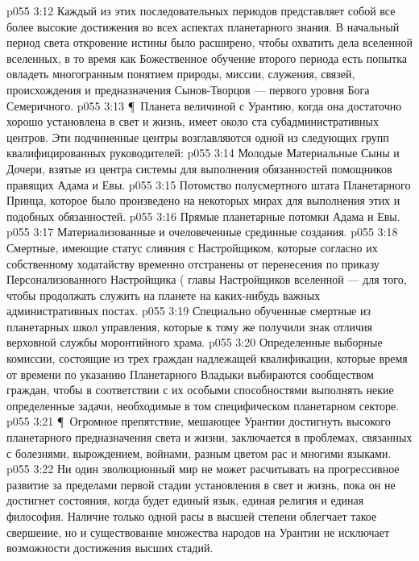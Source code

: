 \vs p055 3:12 Каждый из этих последовательных периодов представляет собой все более высокие достижения во всех аспектах планетарного знания. В начальный период света откровение истины было расширено, чтобы охватить дела вселенной вселенных, в то время как Божественное обучение второго периода есть попытка овладеть многогранным понятием природы, миссии, служения, связей, происхождения и предназначения Сынов\hyp{}Творцов --- первого уровня Бога Семеричного.
\vs p055 3:13 \P\ Планета величиной с Урантию, когда она достаточно хорошо установлена в свет и жизнь, имеет около ста субадминистративных центров. Эти подчиненные центры возглавляются одной из следующих групп квалифицированных руководителей:
\vs p055 3:14 \bibnobreakspace Молодые Материальные Сыны и Дочери, взятые из центра системы для выполнения обязанностей помощников правящих Адама и Евы.
\vs p055 3:15 \bibnobreakspace Потомство полусмертного штата Планетарного Принца, которое было произведено на некоторых мирах для выполнения этих и подобных обязанностей.
\vs p055 3:16 \bibnobreakspace Прямые планетарные потомки Адама и Евы.
\vs p055 3:17 \bibnobreakspace Материализованные и очеловеченные срединные создания.
\vs p055 3:18 \bibnobreakspace Смертные, имеющие статус слияния с Настройщиком, которые согласно их собственному ходатайству временно отстранены от перенесения по приказу Персонализованного Настройщика ( главы Настройщиков вселенной --- для того, чтобы продолжать служить на планете на каких\hyp{}нибудь важных административных постах.
\vs p055 3:19 \bibnobreakspace Специально обученные смертные из планетарных школ управления, которые к тому же получили знак отличия верховной службы моронтийного храма.
\vs p055 3:20 \bibnobreakspace Определенные выборные комиссии, состоящие из трех граждан надлежащей квалификации, которые время от времени по указанию Планетарного Владыки выбираются сообществом граждан, чтобы в соответствии с их особыми способностями выполнять некие определенные задачи, необходимые в том специфическом планетарном секторе.
\vs p055 3:21 \P\ Огромное препятствие, мешающее Урантии достигнуть высокого планетарного предназначения света и жизни, заключается в проблемах, связанных с болезнями, вырождением, войнами, разным цветом рас и многими языками.
\vs p055 3:22 Ни один эволюционный мир не может расчитывать на прогрессивное развитие за пределами первой стадии установления в свет и жизнь, пока он не достигнет состояния, когда будет единый язык, единая религия и единая философия. Наличие только одной расы в высшей степени облегчает такое свершение, но и существование множества народов на Урантии не исключает возможности достижения высших стадий.
